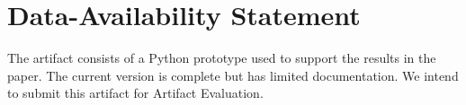 \documentclass[acmsmall,screen,review,anonymous,nonacm]{acmart}
\begin{document}
\section*{Data-Availability Statement}
The artifact consists of a Python prototype used to support the results in the paper. The current version is complete but has limited documentation. We intend to submit this artifact for Artifact Evaluation.





 








\end{document}
